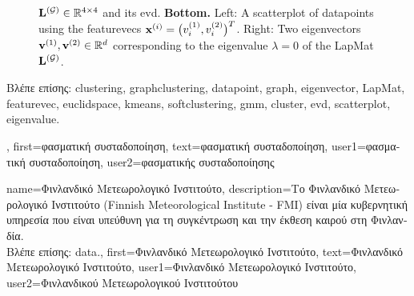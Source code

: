 {{\begin{figure}[H]
\begin{center}
{					${\bf L}^{(\mathcal{G})}  \in \mathbb{R}^{4 \times 4}$ and its \gls{evd}. 
					{\bf Bottom.} Left: A \gls{scatterplot} of \gls{datapoint}s using the \gls{featurevec}s 
					${\bf x}^{(i)} = \big( v^{(1)}_{i},v^{(2)}_{i} \big)^{T}$. 
					Right: Two \gls{eigenvector}s ${\bf v}^{(1)},{\bf v}^{(2)} \in \mathbb{R}^{d}$ 
					corresponding to the \gls{eigenvalue} $\lambda=0$ of the \gls{LapMat} ${\bf L}^{(\mathcal{G})}$. 
					} 
			\end{center}
		\end{figure}
		\newpage
		\foreignlanguage{greek}{Βλέπε επίσης:} \gls{clustering}, \gls{graphclustering}, \gls{datapoint}, \gls{graph}, \gls{eigenvector}, \gls{LapMat}, 
		\gls{featurevec}, \gls{euclidspace}, \gls{kmeans}, \gls{softclustering}, \gls{gmm}, \gls{cluster}, \gls{evd}, \gls{scatterplot}, \gls{eigenvalue}.}, 
	first={\foreignlanguage{greek}{φασματική συσταδοποίηση}},
	text={\foreignlanguage{greek}{φασματική συσταδοποίηση}},
	user1={\foreignlanguage{greek}{φασματική συσταδοποίηση}}, %
    	user2={\foreignlanguage{greek}{φασματικής συσταδοποίησης}} %
}

{name={\foreignlanguage{greek}{Φινλανδικό Μετεωρολογικό Ινστιτούτο}}, 
	description={\foreignlanguage{greek}{Το Φινλανδικό Μετεωρολογικό Ινστιτούτο}
		(Finnish Meteorological Institute - FMI) \foreignlanguage{greek}{είναι μία κυβερνητική υπηρεσία που είναι υπεύθυνη 
		για τη συγκέντρωση και την έκθεση}  \foreignlanguage{greek}{καιρού στη Φινλανδία.} \\
		\foreignlanguage{greek}{Βλέπε επίσης:} \gls{data}.},
	first={\foreignlanguage{greek}{Φινλανδικό Μετεωρολογικό Ινστιτούτο}},
	text={\foreignlanguage{greek}{Φινλανδικό Μετεωρολογικό Ινστιτούτο}},
	user1={\foreignlanguage{greek}{Φινλανδικό Μετεωρολογικό Ινστιτούτο}}, %
	user2={\foreignlanguage{greek}{Φινλανδικού Μετεωρολογικού Ινστιτούτου}} %
}


